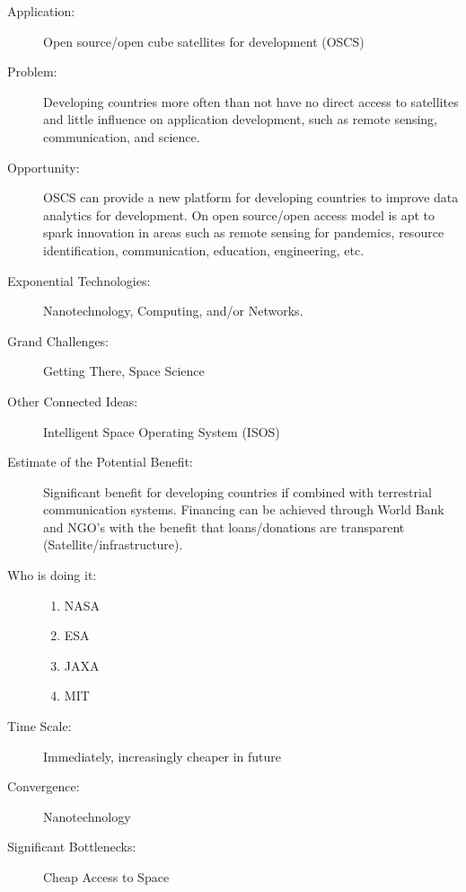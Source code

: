 \begin{description}
\item[Application:] Open source/open cube satellites for development (OSCS)

\item[Problem:] Developing countries more often than not have no direct access to satellites and little
influence on application development, such as remote sensing, communication, and science.

\item[Opportunity:] OSCS can provide a new platform for developing countries to improve data
analytics for development. On open source/open access model is apt to spark innovation in areas
such as remote sensing for pandemics, resource identification, communication, education,
engineering, etc.
\cite{cubesatlaunch}

\item[Exponential Technologies:]    Nanotechnology, Computing, and/or
Networks.

\item[Grand Challenges:] Getting There, Space Science

\item[Other Connected Ideas:]   Intelligent Space Operating System (ISOS)

\item[Estimate of the Potential Benefit:]  Significant benefit for developing countries if combined
with terrestrial communication systems. Financing can be achieved through World Bank and
NGO’s with the benefit that loans/donations are transparent (Satellite/infrastructure).

\item[Who is doing it:]
\hfill\begin{enumerate}
\item NASA
\item ESA
\item JAXA
\item MIT
\end{enumerate}

\item[Time Scale:] Immediately, increasingly cheaper in future

\item[Convergence:] Nanotechnology

\item[Significant Bottlenecks:] Cheap Access to Space
\end{description}

